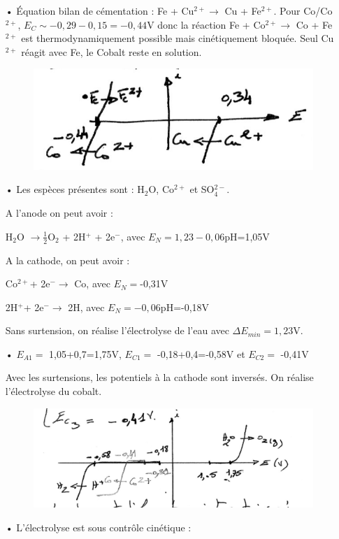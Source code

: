 \documentclass{report}
\begin{document}
\begin{itemize}
	\item[•] Équation  bilan de cémentation : Fe + Cu$^{2+}\longrightarrow$ Cu + Fe$^{2+}$.
	Pour Co/Co$^{2+}$, $E_C\sim-0,29-0,15=-0,44$V donc la réaction Fe + Co$^{2+}\longrightarrow$ Co + Fe$^{2+}$ est thermodynamiquement possible mais cinétiquement bloquée. Seul Cu$^{2+}$ réagit avec Fe, le Cobalt reste en solution.
	\begin{figure}[!h]
	\centering
	\includegraphics[width=0.5\linewidth]{Chimie1.png}
	\end{figure}

	\item[•] Les espèces présentes sont : H$_2$O, Co$^{2+}$ et SO$_{4}^{2-}$.
	
	A l'anode on peut avoir :  
	
	H$_2$O $\longrightarrow\frac{1}{2}$O$_2$ + 2H$^+$ + 2e$^-$, avec $E_N=1,23-0,06$pH=1,05V
	
	A la cathode, on peut avoir : 
	
	 Co$^{2+}$+ 2e$^-\longrightarrow$ Co, avec $E_N=$-0,31V

	 2H$^{+}$+ 2e$^-\longrightarrow$ 2H, avec $E_N=-0,06$pH=-0,18V
	 
	 Sans surtension, on réalise l'électrolyse de l'eau avec $\Delta E_{min}=1,23$V.
	 
	 \item[•] $E_{A1} =$ 1,05+0,7=1,75V, $E_{C1} =$ -0,18+0,4=-0,58V et $E_{C2} =$ -0,41V
	 
	 Avec les surtensions, les potentiels à la cathode sont inversés. On réalise l'électrolyse du cobalt. 
	 \begin{figure}[!h]
	\centering
	\includegraphics[width=0.8\linewidth]{Chimie2.png}
	\end{figure}

	 \item[•] L'électrolyse est sous contrôle cinétique : 
	 

\end{itemize}
\end{document}
